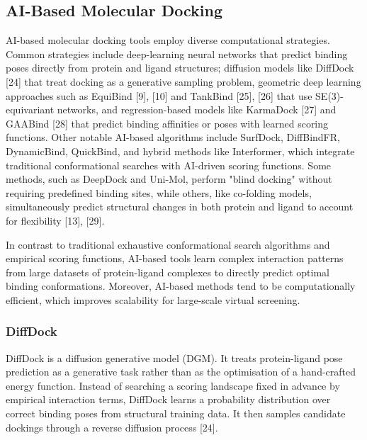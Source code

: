 \hypertarget{ai-based-molecular-docking-1}{%
\subsection{AI-Based Molecular Docking}\label{ai-based-molecular-docking-1}}

AI-based molecular docking tools employ diverse computational strategies. Common strategies include deep-learning neural networks that predict binding poses directly from protein and ligand structures; diffusion models like DiffDock {[}24{]} that treat docking as a generative sampling problem, geometric deep learning approaches such as EquiBind {[}9{]}, {[}10{]} and TankBind {[}25{]}, {[}26{]} that use SE(3)-equivariant networks, and regression-based models like KarmaDock {[}27{]} and GAABind {[}28{]} that predict binding affinities or poses with learned scoring functions. Other notable AI-based algorithms include SurfDock, DiffBindFR, DynamicBind, QuickBind, and hybrid methods like Interformer, which integrate traditional conformational searches with AI-driven scoring functions. Some methods, such as DeepDock and Uni-Mol, perform "blind docking" without requiring predefined binding sites, while others, like co-folding models, simultaneously predict structural changes in both protein and ligand to account for flexibility {[}13{]}, {[}29{]}.

In contrast to traditional exhaustive conformational search algorithms and empirical scoring functions, AI-based tools learn complex interaction patterns from large datasets of protein-ligand complexes to directly predict optimal binding conformations. Moreover, AI-based methods tend to be computationally efficient, which improves scalability for large-scale virtual screening.

\hypertarget{diffdock-1}{%
\subsubsection{DiffDock}\label{diffdock-1}}

DiffDock is a diffusion generative model (DGM). It treats protein-ligand pose prediction as a generative task rather than as the optimisation of a hand-crafted energy function. Instead of searching a scoring landscape fixed in advance by empirical interaction terms, DiffDock learns a probability distribution over correct binding poses from structural training data. It then samples candidate dockings through a reverse diffusion process {[}24{]}.

